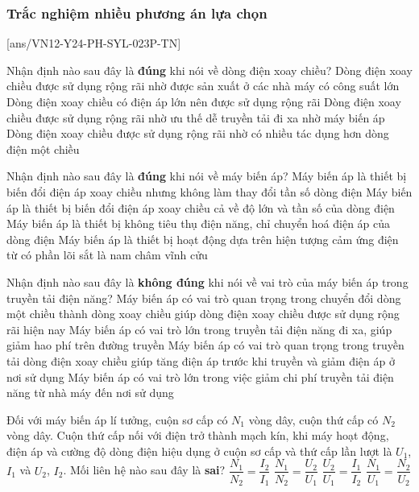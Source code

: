 \subsubsection{Trắc nghiệm nhiều phương án lựa chọn}
\setcounter{ex}{0}
[ans/VN12-Y24-PH-SYL-023P-TN]
\begin{ex}
	Nhận định nào sau đây là \textbf{đúng} khi nói về dòng điện xoay chiều?
	\choice
	{Dòng điện xoay chiều được sử dụng rộng rãi nhờ được sản xuất ở các nhà máy có công suất lớn}
	{Dòng điện xoay chiều có điện áp lớn nên được sử dụng rộng rãi}
	{\True Dòng điện xoay chiều được sử dụng rộng rãi nhờ ưu thế dễ truyền tải đi xa nhờ máy biến áp}
	{Dòng điện xoay chiều được sử dụng rộng rãi nhờ có nhiều tác dụng hơn dòng điện một chiều}
	\loigiai{}
\end{ex}
\begin{ex}
	Nhận định nào sau đây là \textbf{đúng} khi nói về máy biến áp?
	\choice
	{\True Máy biến áp là thiết bị biến đổi điện áp xoay chiều nhưng không làm thay đổi tần số dòng điện}
	{Máy biến áp là thiết bị biến đổi điện áp xoay chiều cả về độ lớn và tần số của dòng điện}
	{Máy biến áp là thiết bị không tiêu thụ điện năng, chỉ chuyển hoá điện áp của dòng điện}
	{Máy biến áp là thiết bị hoạt động dựa trên hiện tượng cảm ứng điện từ có phần lõi sắt là nam châm vĩnh cửu}
	\loigiai{}
\end{ex}
\begin{ex}
	Nhận định nào sau đây là \textbf{không đúng} khi nói về vai trò của máy biến áp trong truyền tải điện năng?	
	\choice
	{\True Máy biến áp có vai trò quan trọng trong chuyển đổi dòng một chiều thành dòng xoay chiều giúp dòng điện xoay chiều được sử dụng rộng rãi hiện nay}
	{Máy biến áp có vai trò lớn trong truyền tải điện năng đi xa, giúp giảm hao phí trên đường truyền}
	{Máy biến áp có vai trò quan trọng trong truyền tải dòng điện xoay chiều giúp tăng điện áp trước khi truyền và giảm điện áp ở nơi sử dụng}
	{Máy biến áp có vai trò lớn trong việc giảm chi phí truyền tải điện năng từ nhà máy đến nơi sử dụng}
	\loigiai{}
\end{ex}
\begin{ex}
	Đối với máy biến áp lí tưởng, cuộn sơ cấp có $N_1$ vòng dây, cuộn thứ cấp có $N_2$ vòng dây. Cuộn thứ cấp nối với điện trở thành mạch kín, khi máy hoạt động, điện áp và cường độ dòng điện hiệu dụng ở cuộn sơ cấp và thứ cấp lần lượt là $U_1$, $I_1$ và $U_2$, $I_2$. Mối liên hệ nào sau đây là \textbf{sai}?	
	\choice
	{$\dfrac{N_1}{N_2}=\dfrac{I_2}{I_1}$}
	{\True $\dfrac{N_1}{N_2}=\dfrac{U_2}{U_1}$}
	{$\dfrac{U_2}{U_1}=\dfrac{I_1}{I_2}$}
	{$\dfrac{N_1}{U_1}=\dfrac{N_2}{U_2}$}
	\loigiai{}
\end{ex}
